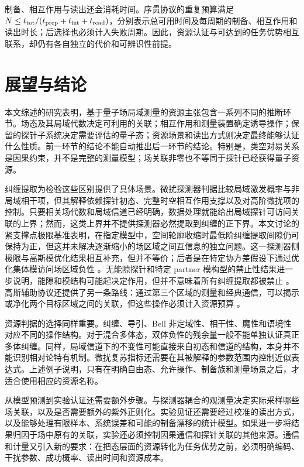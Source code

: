 \documentclass[UTF8,11pt,a4paper,fontset=none]{ctexart}
\begin{document}
制备、相互作用与读出还会消耗时间。序贯协议的重复预算满足 $N\leq t_{\rm tot}/(t_{\rm prep}+t_{\rm int}+t_{\rm read})$，分别表示总可用时间及每周期的制备、相互作用和读出时长；后选择也必须计入失败周期。因此，资源认证与可达到的任务优势相互联系，却仍有各自独立的代价和可辨识性前提。

\section{展望与结论}
\label{sec:conclusion}

本文综述的研究表明，基于量子场局域测量的资源主张包含一系列不同的推断环节。场态及其局域代数决定可利用的关联；相互作用和测量装置确定诱导操作；保留的探针子系统决定需要评估的量子态；资源场景和读出方式则决定最终能够认证什么性质。前一环节的结论不能自动推出后一环节的结论。特别是，类空对易关系是因果约束，并不是完整的测量模型；场关联非零也不等同于探针已经获得量子资源。

纠缠提取为检验这些区别提供了具体场景。微扰探测器判据比较局域激发概率与非局域相干项，但其解释依赖探针初态、完整时空相互作用支撑以及对高阶微扰项的控制。只要相关场代数和局域信道已经明确，数据处理就能给出局域探针可访问关联的上界；然而，这类上界并不提供探测器必然提取到纠缠的正下界。本文讨论的紧支撑点极限基准表明，在指定模型中，空间轮廓收缩时最低阶纠缠提取间隙仍可保持为正，但这并未解决逐渐缩小的场区域之间互信息的独立问题。这一探测器侧极限与高斯模优化结果相互补充，但并不等价；后者是在特定协方差假设下通过优化集体模访问场区域负性 \cite{Torres2023,GaoKlco2025}。无能隙探针和特定 partner 模构型的禁止性结果进一步说明，能隙和模结构可能起决定作用，但并不意味着所有纠缠提取都被禁止 \cite{PozasKerstjensLoukoMartinez2017,OsawaNambuYoshimoto2026}。 高斯辅助协议还提供了另一条路线：通过第三个区域的测量和经典通信，可以揭示或净化两个目标区域之间的关联，但这些操作必须计入资源预算 \cite{GaoKlco2026Assistance}。

资源判据的选择同样重要。纠缠、导引、Bell 非定域性、相干性、魔性和语境性对应不同的操作结构。对于混合多体态，双体负性的残余量一般不能单独认证真正多体纠缠。同样，局域信道下的不变性可能直接来自初态和信道的结构，本身并不能识别相对论特有机制。微扰复苏指标还需要在其被解释的参数范围内控制近似表达式。上述例子说明，只有在明确自由态、允许操作、制备族和测量场景之后，才适合使用相应的资源名称。

从模型预测到实验认证还需要额外步骤。与探测器耦合的观测量决定实际采样哪些场关联，以及是否需要额外的紫外正则化。实验见证还需要经过校准的读出方式，以及能够处理有限样本、系统误差和可能的制备漂移的统计模型。如果进一步将结果归因于场中原有的关联，实验还必须控制因果通信和探针关联的其他来源。通信和计量又引入新的要求：在把态层面的资源转化为任务优势之前，必须明确编码、干扰参数、成功概率、读出时间和资源成本。
\end{document}
